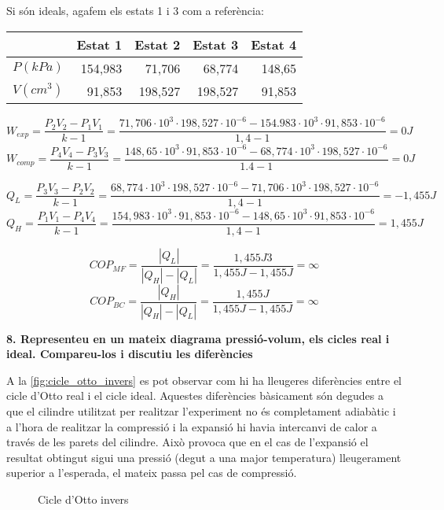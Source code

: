\documentclass[a4paper]{article}
\begin{document}
Si són ideals, agafem els estats 1 i 3 com a referència:

\begin{center}
	\begin{tabular}{l|rrrr}
		& Estat 1 & Estat 2 & Estat 3 & Estat 4 \\
		\hline
		$P(kPa)$ & 154,983 & 71,706  & 68,774 &  148,65 \\
		$V(cm^3)$ & 91,853 & 198,527 & 198,527 & 91,853 \\
	\end{tabular}
\end{center}

$$ W_{exp} = \frac{P_2 V_2 - P_1 V_1}{k - 1} = 
\frac{71,706·10^3 · 198,527·10^{-6} - 154.983·10^3 · 91,853·10^{-6}}{1,4 - 1} =
\boxed{0J} 
$$
$$ W_{comp} = \frac{P_4 V_4 - P_3 V_3}{k - 1} = 
\frac{148,65·10^3 · 91,853·10^{-6} - 68,774·10^3 · 198,527·10^{-6}}{1.4 - 1} =
\boxed{0J}
$$

$$ Q_L = \frac{P_3 V_3 - P_2 V_2}{k - 1} = 
\frac{68,774·10^3 · 198,527·10^{-6} - 71,706·10^3 · 198,527·10^{-6}}{1,4 - 1} = 
\boxed{-1,455J}
$$
$$ Q_H = \frac{P_1 V_1 - P_4 V_4}{k - 1} =
\frac{154,983·10^3 · 91,853·10^{-6} - 148,65·10^3 · 91,853·10^{-6}}{1,4 - 1} =
\boxed{1,455J}
$$

$$ 
COP_{MF} = \frac{|Q_L|}{|Q_H| - |Q_L|} =
\frac{1,455J3}{1,455J - 1,455J} = \boxed{\infty} 
$$
$$ 
COP_{BC} = \frac{|Q_H|}{|Q_H| - |Q_L|} =
\frac{1,455J}{1,455J - 1,455J} = \boxed{\infty} 
$$

\textbf{8. Representeu en un mateix diagrama pressió-volum, els cicles real i ideal. Compareu-los i discutiu les diferències}

A la \autoref{fig:cicle_otto_invers} es pot observar com hi ha lleugeres diferències entre el cicle d'Otto real i el cicle ideal. Aquestes diferències bàsicament són degudes a que el cilindre utilitzat per realitzar l'experiment no és completament adiabàtic i a l'hora de realitzar la compressió i la expansió hi havia intercanvi de calor a través de les parets del cilindre. Això provoca que en el cas de l'expansió el resultat obtingut sigui una pressió (degut a una major temperatura) lleugerament superior a l'esperada, el mateix passa pel cas de compressió.

\begin{figure}[H]
    \centering
    \caption{Cicle d'Otto invers}
    \label{fig:cicle_otto_invers}
\end{figure}
\end{document}
